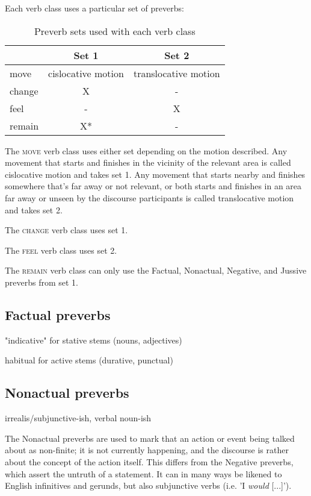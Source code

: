 \documentclass[smallroyalvopaper,9pt]{memoir}
\begin{document}
Each verb class uses a particular set of preverbs:

\begin{table}[ht]
    \centering
    \begin{tabular}{>{\sc}lcc}
        \toprule
        & Set 1 & Set 2 \\
        \midrule
        move & cislocative motion & translocative motion \\
        change & X & - \\
        feel & - & X \\
        remain & X* & -\\
        \bottomrule
    \end{tabular}
    \caption{Preverb sets used with each verb class}
\end{table}

The \textsc{move} verb class uses either set depending on the motion described. Any movement that starts and finishes in the vicinity of the relevant area is called cislocative motion and takes set 1. Any movement that starts nearby and finishes somewhere that's far away or not relevant, or both starts and finishes in an area far away or unseen by the discourse participants is called translocative motion and takes set 2.

The \textsc{change} verb class uses set 1.

The \textsc{feel} verb class uses set 2.

The \textsc{remain} verb class can only use the Factual, Nonactual, Negative, and Jussive preverbs from set 1.

\subsection{Factual preverbs}

"indicative" for stative stems (nouns, adjectives)

habitual for active stems (durative, punctual)

\subsection{Nonactual preverbs}

irrealis/subjunctive-ish, verbal noun-ish

The Nonactual preverbs are used to mark that an action or event being talked about as non-finite; it is not currently happening, and the discourse is rather about the concept of the action itself. This differs from the Negative preverbs, which assert the untruth of a statement. It can in many ways be likened to English infinitives and gerunds, but also subjunctive verbs (i.e. 'I \textit{would} [...]'). 
\end{document}
